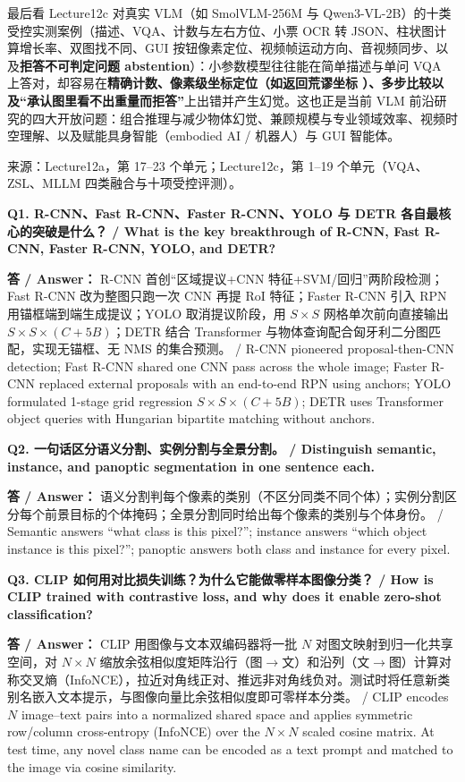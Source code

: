 最后看 Lecture12c 对真实 VLM（如 SmolVLM-256M 与 Qwen3-VL-2B）的十类受控实测案例（描述、VQA、计数与左右方位、小票 OCR 转 JSON、柱状图计算增长率、双图找不同、GUI 按钮像素定位、视频帧运动方向、音视频同步、以及\textbf{拒答不可判定问题 abstention}）：小参数模型往往能在简单描述与单问 VQA 上答对，却容易在\textbf{精确计数、像素级坐标定位（如返回荒谬坐标 \StudyInline{[5,5,5,5]}）、多步比较以及“承认图里看不出重量而拒答”}上出错并产生幻觉。这也正是当前 VLM 前沿研究的四大开放问题：组合推理与减少物体幻觉、兼顾规模与专业领域效率、视频时空理解、以及赋能具身智能（embodied AI / 机器人）与 GUI 智能体。

来源：Lecture12a，第 17–23 个单元；Lecture12c，第 1–19 个单元（VQA、ZSL、MLLM 四类融合与十项受控评测）。



\textbf{Q1. R-CNN、Fast R-CNN、Faster R-CNN、YOLO 与 DETR 各自最核心的突破是什么？ / What is the key breakthrough of R-CNN, Fast R-CNN, Faster R-CNN, YOLO, and DETR?}

\textbf{答 / Answer：} R-CNN 首创“区域提议+CNN 特征+SVM/回归”两阶段检测；Fast R-CNN 改为整图只跑一次 CNN 再提 RoI 特征；Faster R-CNN 引入 RPN 用锚框端到端生成提议；YOLO 取消提议阶段，用 $S\times S$ 网格单次前向直接输出 $S\times S\times(C+5B)$；DETR 结合 Transformer 与物体查询配合匈牙利二分图匹配，实现无锚框、无 NMS 的集合预测。 / R-CNN pioneered proposal-then-CNN detection; Fast R-CNN shared one CNN pass across the whole image; Faster R-CNN replaced external proposals with an end-to-end RPN using anchors; YOLO formulated 1-stage grid regression $S\times S\times(C+5B)$; DETR uses Transformer object queries with Hungarian bipartite matching without anchors.

\textbf{Q2. 一句话区分语义分割、实例分割与全景分割。 / Distinguish semantic, instance, and panoptic segmentation in one sentence each.}

\textbf{答 / Answer：} 语义分割判每个像素的类别（不区分同类不同个体）；实例分割区分每个前景目标的个体掩码；全景分割同时给出每个像素的类别与个体身份。 / Semantic answers ``what class is this pixel?''; instance answers ``which object instance is this pixel?''; panoptic answers both class and instance for every pixel.

\textbf{Q3. CLIP 如何用对比损失训练？为什么它能做零样本图像分类？ / How is CLIP trained with contrastive loss, and why does it enable zero-shot classification?}

\textbf{答 / Answer：} CLIP 用图像与文本双编码器将一批 $N$ 对图文映射到归一化共享空间，对 $N\times N$ 缩放余弦相似度矩阵沿行（图\ensuremath{\to}文）和沿列（文\ensuremath{\to}图）计算对称交叉熵（InfoNCE），拉近对角线正对、推远非对角线负对。测试时将任意新类别名嵌入文本提示，与图像向量比余弦相似度即可零样本分类。 / CLIP encodes $N$ image–text pairs into a normalized shared space and applies symmetric row/column cross-entropy (InfoNCE) over the $N\times N$ scaled cosine matrix. At test time, any novel class name can be encoded as a text prompt and matched to the image via cosine similarity.

